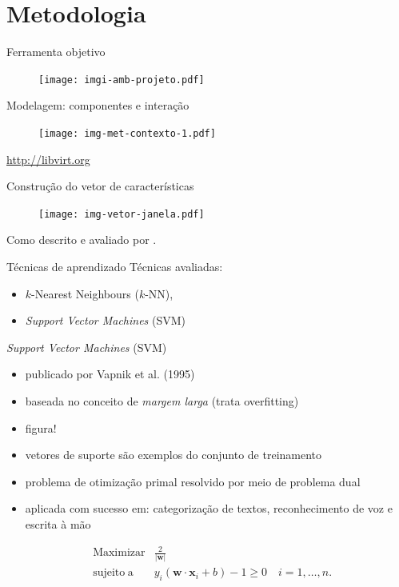 \documentclass{beamer}
\newcommand{\vect}[1]{\mathbf{#1}}
\newcommand{\norma}[1]{| #1 |}
\begin{document}
\section{Metodologia}

\begin{frame}{Ferramenta objetivo}
\begin{figure}
\centering
\texttt{[image: imgi-amb-projeto.pdf]}
\end{figure}
\end{frame}

\begin{frame}{Modelagem: componentes e interação}
\begin{figure}
\centering
\texttt{[image: img-met-contexto-1.pdf]}
\end{figure}
\tiny{\url{http://libvirt.org}}
\end{frame}

\begin{frame}{Construção do vetor de características}
\begin{figure}
\centering
\texttt{[image: img-vetor-janela.pdf]}
\end{figure}
\tiny{Como descrito e avaliado por \cite{frank2001time}.}
\end{frame}

\begin{frame}{Técnicas de aprendizado}
Técnicas avaliadas:
\begin{itemize}
\item $k$-Nearest Neighbours ($k$-NN),
\item \emph{Support Vector Machines} (SVM)
\end{itemize}
\end{frame}

\begin{frame}{\emph{Support Vector Machines} (SVM)}
\begin{itemize}
  \item publicado por Vapnik et al. (1995)\nocite{vapnik1998statistical}
  \item baseada no conceito de \emph{margem larga} (trata overfitting)
  \item figura!
  \item vetores de suporte são exemplos do conjunto de treinamento
  \item problema de otimiza\c{c}ão primal resolvido por meio de problema
dual
  \item aplicada com sucesso em: categorização de textos, reconhecimento de
voz e escrita à mão\cite{bennett2000support}
\end{itemize}

\begin{eqnarray}
& \label{eq:max_w0}\operatorname{Maximizar} & \frac{2}{\norma{\vect{w}}} \\
& \label{eq:max_w1} \operatorname{sujeito\;a} & y_i(\vect{w}\cdot\vect{x}_i + b) - 1 \ge 0 \quad i = 1,\dotsc,n.
\end{eqnarray}

\end{frame}
\end{document}
